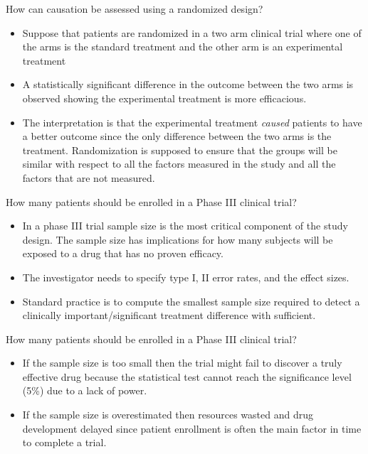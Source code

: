 \documentclass[ignorenonframetext,]{beamer}
\begin{document}
\begin{frame}{How can causation be assessed using a randomized design?}

\begin{itemize}[<+->]
\item
  Suppose that patients are randomized in a two arm clinical trial where
  one of the arms is the standard treatment and the other arm is an
  experimental treatment
\item
  A statistically significant difference in the outcome between the two
  arms is observed showing the experimental treatment is more
  efficacious.
\item
  The interpretation is that the experimental treatment \emph{caused}
  patients to have a better outcome since the only difference between
  the two arms is the treatment. Randomization is supposed to ensure
  that the groups will be similar with respect to all the factors
  measured in the study and all the factors that are not measured.
\end{itemize}

\end{frame}

\begin{frame}{How many patients should be enrolled in a Phase III
clinical trial?}

\begin{itemize}[<+->]
\itemsep1pt\parskip0pt
\item
  In a phase III trial sample size is the most critical component of the
  study design. The sample size has implications for how many subjects
  will be exposed to a drug that has no proven efficacy.
\item
  The investigator needs to specify type I, II error rates, and the
  effect sizes.
\item
  Standard practice is to compute the smallest sample size required to
  detect a clinically important/significant treatment difference with
  sufficient.
\end{itemize}

\end{frame}

\begin{frame}{How many patients should be enrolled in a Phase III
clinical trial?}

\begin{itemize}[<+->]
\itemsep1pt\parskip0pt
\item
  If the sample size is too small then the trial might fail to discover
  a truly effective drug because the statistical test cannot reach the
  significance level (5\%) due to a lack of power.
\item
  If the sample size is overestimated then resources wasted and drug
  development delayed since patient enrollment is often the main factor
  in time to complete a trial.
\end{itemize}

\end{frame}
\end{document}
